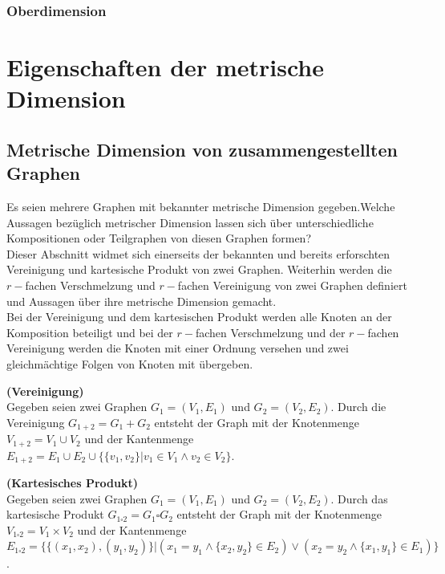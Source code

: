 \subsection{Oberdimension}


\chapter{Eigenschaften der metrische Dimension}
\section{Metrische Dimension von zusammengestellten Graphen}
\label{kapallg}
Es seien mehrere Graphen mit bekannter metrische Dimension gegeben.\newline Welche Aussagen bezüglich metrischer Dimension lassen sich über unterschiedliche Kompositionen oder Teilgraphen von diesen Graphen formen?\\Dieser Abschnitt widmet sich einerseits der bekannten und bereits erforschten Vereinigung und kartesische Produkt von zwei Graphen. Weiterhin werden die $r-$fachen Verschmelzung und $r-$fachen Vereinigung von zwei Graphen definiert und Aussagen über ihre metrische Dimension gemacht.\\Bei der Vereinigung und dem kartesischen Produkt werden alle Knoten an der Komposition beteiligt und bei der $r-$fachen Verschmelzung und der $r-$fachen Vereinigung werden die Knoten mit einer Ordnung versehen und zwei gleichmächtige Folgen von Knoten mit übergeben.   
\begin{defi}{\textbf{(Vereinigung)}}\\
Gegeben seien zwei Graphen $G_1=(V_1,E_1)$ und $G_2=(V_2,E_2)$. Durch die Vereinigung $G_{1+2}=G_1+G_2$ entsteht der Graph mit der Knotenmenge $V_{1+2}=V_1 \cup V_2$ und der Kantenmenge $E_{1+2}= E_1 \cup E_2 \cup \{\{v_1,v_2\}| v_1 \in V_1 \wedge v_2 \in V_2\}$.
\end{defi}

\begin{defi}{\textbf{(Kartesisches Produkt)}}\\
Gegeben seien zwei Graphen $G_1=(V_1,E_1)$ und $G_2=(V_2,E_2)$. Durch das kartesische Produkt $G_{1\square 2}=G_1 \square G_2$ entsteht der Graph mit der Knotenmenge $V_{1 \square 2}=V_1 \times V_2$ und der Kantenmenge $E_{1\square 2}= \{\{(x_1,x_2),(y_1,y_2)\}| (x_1=y_1 \wedge \{x_2,y_2\} \in E_2)\vee (x_2=y_2 \wedge \{x_1,y_1\} \in E_1)\}$. 
\end{defi}

